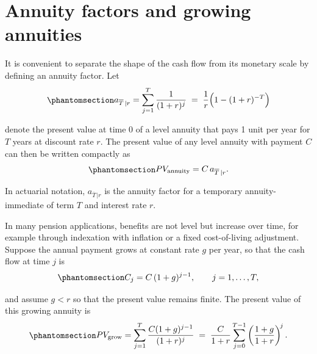 \documentclass[
  letterpaper,
  DIV=11,
  numbers=noendperiod]{scrreprt}
\begin{document}
\section*{Annuity factors and growing
annuities}\label{annuity-factors-and-growing-annuities}


It is convenient to separate the shape of the cash flow from its
monetary scale by defining an annuity factor. Let
\begin{equation}\protect\phantomsection\label{eq-gen-0002}{
\begin{align}
    a_{\overline{T}\,|r}
    = \sum_{j=1}^{T} \frac{1}{(1 + r)^j}
     \;=\; \frac{1}{r}\Big(1 - (1 + r)^{-T}\Big)
\end{align}
}\end{equation}

denote the present value at time \(0\) of a level annuity that pays 1
unit per year for \(T\) years at discount rate \(r\). The present value
of any level annuity with payment \(C\) can then be written compactly as
\begin{equation}\protect\phantomsection\label{eq-gen-0003}{
\begin{align}
    PV_{\text{annuity}} = C \, a_{\overline{T}\,|r}.
\end{align}
}\end{equation}

In actuarial notation, \(a_{\overline{T}\,|r}\) is the annuity factor
for a temporary annuity-immediate of term \(T\) and interest rate \(r\).

In many pension applications, benefits are not level but increase over
time, for example through indexation with inflation or a fixed
cost-of-living adjustment. Suppose the annual payment grows at constant
rate \(g\) per year, so that the cash flow at time \(j\) is
\begin{equation}\protect\phantomsection\label{eq-gen-0004}{
\begin{align}
    C_j = C \,(1 + g)^{j-1}, \qquad j = 1,\dots,T,
\end{align}
}\end{equation}

and assume \(g < r\) so that the present value remains finite. The
present value of this growing annuity is
\begin{equation}\protect\phantomsection\label{eq-gen-0005}{
\begin{align}
    PV_{\text{grow}}  = \sum_{j=1}^{T} \frac{C (1 + g)^{j-1}}{(1 + r)^j}
     \;=\; \frac{C}{1 + r} \sum_{j=0}^{T-1}
            \left(\frac{1 + g}{1 + r}\right)^{\!j}.
\end{align}
}\end{equation}
\end{document}
